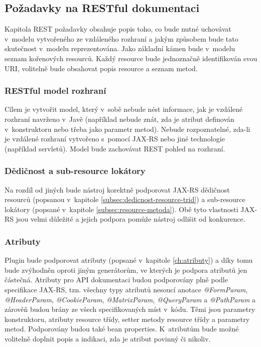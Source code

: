 \documentclass[11pt,twoside,a4paper]{book}
\begin{document}
\subsection{Požadavky na RESTful dokumentaci}
\label{subsec:pozadavky-na-restful-doc}

Kapitola REST požadavky obsahuje popis toho, co bude nutné uchovávat v~modelu
vytvořeného ze vzdáleného rozhraní a jakým způsobem bude tato skutečnost v~modelu
reprezentována. Jako základní kámen bude v~modelu seznam kořenových resourců. Každý
resource bude jednoznačně identifikován svou URI, volitelně bude obsahovat popis resource a
seznam metod.

\subsubsection{RESTful model rozhraní}

Cílem je vytvořit model, který v~sobě nebude nést informace, jak je vzdálené rozhraní
navrženo v~Javě (například nebude znát, zda je atribut definován v~konstruktoru nebo třeba
jako parametr metod). Nebude rozpoznatelné, zda-li je vzdálené rozhraní vytvořeno s~pomocí
JAX-RS nebo jiné technologie (například servletů). Model bude zachovávat REST pohled na
rozhraní.

\subsubsection{Dědičnost a sub-resource lokátory}

Na rozdíl od jiných bude nástroj korektně podporovat JAX-RS dědičnost resourců (popsanou
v~kapitole \ref{subsec:dedicnost-resource-trid}) a sub-resource lokátory
(popsané v~kapitole \ref{subsec:resource-metoda}). Obě tyto vlastnosti JAX-RS jsou
velmi důležité a jejich podpora pomůže nástroj odlišit od konkurence.

\subsubsection{Atributy}

Plugin bude podporovat atributy (popsané v~kapitole \ref{ch:atributy}) a díky
tomu bude zvýhodněn oproti jiným generátorům, ve kterých je podpora atributů jen částečná. Atributy pro API
dokumentaci budou podporovány plně podle specifikace JAX-RS, tzn. všechny typy atributů
nesoucí anotace {\em @FormParam}, {\em @HeaderParam}, {\em @CookieParam}, {\em @MatrixParam},
{\em @QueryParam} a {\em @PathParam} a zárověň budou brány ze všech specifikovaných míst
v~kódu. Těmi jsou parametry konstruktoru, atributy resource třídy, setter metody
resource třídy a parametry metod. Podporovány budou také bean properties. K~atributům bude možné
volitelně doplnit popis a indikaci, zda je atribut povinný či nikoliv.
\end{document}
